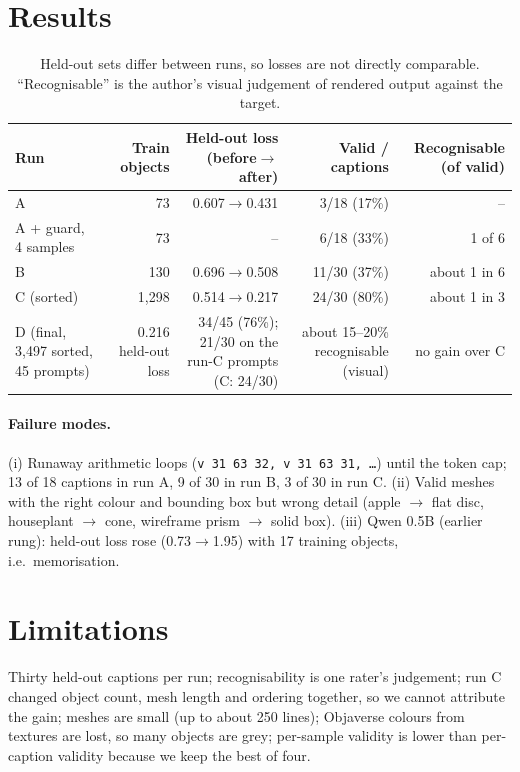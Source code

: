 \documentclass[11pt]{article}
\begin{document}
\section{Results}
\begin{table}[h]\centering
\begin{tabular}{lrrrr}
\toprule
Run & Train objects & Held-out loss (before$\to$after) & Valid / captions & Recognisable (of valid) \\
\midrule
A & 73 & 0.607$\to$0.431 & 3/18 (17\%) & -- \\
A + guard, 4 samples & 73 & -- & 6/18 (33\%) & 1 of 6 \\
B & 130 & 0.696$\to$0.508 & 11/30 (37\%) & about 1 in 6 \\
C (sorted) & 1{,}298 & 0.514$\to$0.217 & 24/30 (80\%) & about 1 in 3 \\
D (final, 3,497 sorted, 45 prompts) & 0.216 held-out loss & 34/45 (76\%); 21/30 on the run-C prompts (C: 24/30) & about 15--20\% recognisable (visual) & no gain over C \\
\bottomrule
\end{tabular}
\caption{Held-out sets differ between runs, so losses are not directly comparable. ``Recognisable'' is the author's visual judgement of rendered output against the target.}
\end{table}
\paragraph{Failure modes.} (i) Runaway arithmetic loops (\texttt{v 31 63 32, v 31 63 31, \dots}) until the token cap; 13 of 18 captions in run A, 9 of 30 in run B, 3 of 30 in run C.
(ii) Valid meshes with the right colour and bounding box but wrong detail (apple $\to$ flat disc, houseplant $\to$ cone, wireframe prism $\to$ solid box).
(iii) Qwen 0.5B (earlier rung): held-out loss rose (0.73$\to$1.95) with 17 training objects, i.e.\ memorisation.

\section{Limitations}
Thirty held-out captions per run; recognisability is one rater's judgement; run C changed object count, mesh length and ordering together, so we cannot attribute the gain; meshes are small (up to about 250 lines); Objaverse colours from textures are lost, so many objects are grey; per-sample validity is lower than per-caption validity because we keep the best of four.
\end{document}
